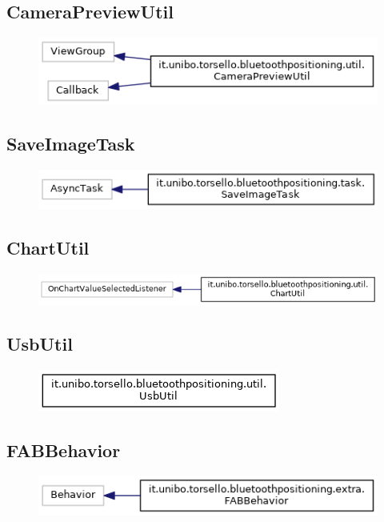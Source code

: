 \subsection{CameraPreviewUtil}
\begin{figure}[ph]
	\centering
	\includegraphics[scale=.55]{img/uml/inherit_graph/inherit_graph_16.png}
	\caption[]{}
\end{figure}

\subsection{SaveImageTask}
\begin{figure}[ph]
	\centering
	\includegraphics[scale=.55]{img/uml/inherit_graph/inherit_graph_15.png}
	\caption[]{}
\end{figure}

\subsection{ChartUtil}
\begin{figure}[ph]
	\centering
	\includegraphics[scale=.55]{img/uml/inherit_graph/inherit_graph_17.png}
	\caption[]{}
\end{figure}

\newpage
\subsection{UsbUtil}
\begin{figure}[ph]
	\centering
	\includegraphics[scale=.55]{img/uml/inherit_graph/inherit_graph_18.png}
	\caption[]{}
\end{figure}

\subsection{FABBehavior}
\begin{figure}[ph]
	\centering
	\includegraphics[scale=.55]{img/uml/inherit_graph/inherit_graph_9.png}
	\caption[]{}
\end{figure}
